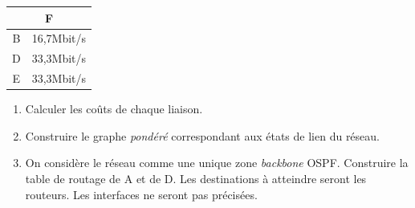 \documentclass[a4paper,11pt]{article}
\begin{document}
\begin{exo}
\begin{center}
    \begin{tabular}{|c|c|}
        \hline
        \multicolumn{2}{|c|}{F}\\
        \hline
        B & 16,7Mbit/s\\
        \hline
        D & 33,3Mbit/s\\
        \hline
        E & 33,3Mbit/s\\
        \hline
    \end{tabular} 
\end{center}
\begin{enumerate}
    \item Calculer les coûts de chaque liaison.
    \item Construire le graphe \emph{pondéré} correspondant aux états de lien du réseau.
    \item On considère le réseau comme une unique zone \emph{backbone} OSPF. Construire la table de routage de A et de D. Les destinations à atteindre seront les routeurs. Les interfaces ne seront pas précisées.
\end{enumerate}
\end{exo}
\end{document}
